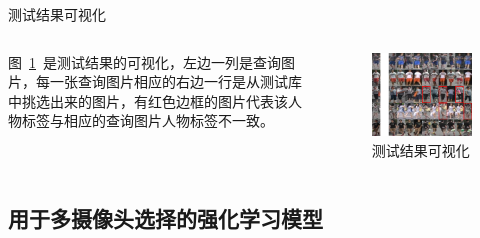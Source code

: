 \begin{frame}{测试结果可视化}
    \begin{columns}
        \begin{column}{0.5\textwidth}
            图~\ref{fig:testvis}~是测试结果的可视化，左边一列是查询图片，每一张查询图片相应的右边一行是从测试库中挑选出来的图片，有红色边框的图片代表该人物标签与相应的查询图片人物标签不一致。
        \end{column}
        \begin{column}{0.5\textwidth}
            \begin{figure}
            \centering
            \includegraphics[width=\textwidth]{figures/vis3}
            \caption{测试结果可视化}
            \label{fig:testvis}
            \end{figure}
        \end{column}
    \end{columns}
\end{frame}

\subsection{用于多摄像头选择的强化学习模型}

